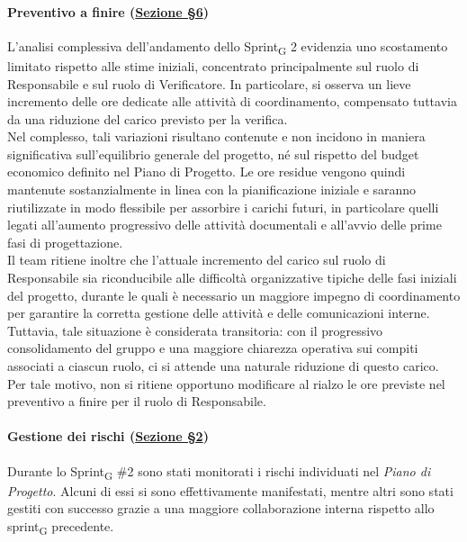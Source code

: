 \documentclass[a4paper, 10pt, colorlinks=true, linkcolor=black, urlcolor=blue, citecolor=blue, hidelinks]{article}
\begin{document}
\paragraph{Preventivo a finire (\hyperref[tab:preventivo-finire]{Sezione \S6})}
L’analisi complessiva dell’andamento dello Sprint\textsubscript{G} 2 evidenzia uno scostamento limitato rispetto alle stime iniziali, concentrato principalmente sul ruolo di Responsabile e sul ruolo di Verificatore. In particolare, si osserva un lieve incremento delle ore dedicate alle attività di coordinamento, compensato tuttavia da una riduzione del carico previsto per la verifica.\\
Nel complesso, tali variazioni risultano contenute e non incidono in maniera significativa sull’equilibrio generale del progetto, né sul rispetto del budget economico definito nel Piano di Progetto. Le ore residue vengono quindi mantenute sostanzialmente in linea con la pianificazione iniziale e saranno riutilizzate in modo flessibile per assorbire i carichi futuri, in particolare quelli legati all’aumento progressivo delle attività documentali e all’avvio delle prime fasi di progettazione.\\
Il team ritiene inoltre che l’attuale incremento del carico sul ruolo di Responsabile sia riconducibile alle difficoltà organizzative tipiche delle fasi iniziali del progetto, durante le quali è necessario un maggiore impegno di coordinamento per garantire la corretta gestione delle attività e delle comunicazioni interne. Tuttavia, tale situazione è considerata transitoria: con il progressivo consolidamento del gruppo e una maggiore chiarezza operativa sui compiti associati a ciascun ruolo, ci si attende una naturale riduzione di questo carico. Per tale motivo, non si ritiene opportuno modificare al rialzo le ore previste nel preventivo a finire per il ruolo di Responsabile.

\paragraph{Gestione dei rischi (\hyperref[tab:gestione-rischi]{Sezione \S2})}
Durante lo Sprint\textsubscript{G} \#2 sono stati monitorati i rischi individuati nel \textit{Piano di Progetto}. Alcuni di essi si sono effettivamente manifestati, mentre altri sono stati gestiti con successo grazie a una maggiore collaborazione interna rispetto allo sprint\textsubscript{G} precedente.
\end{document}
